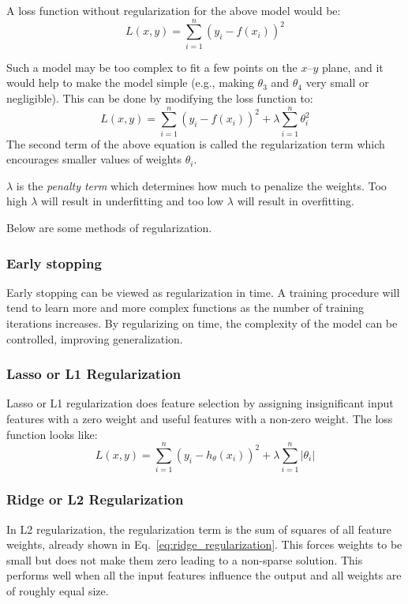 A loss function without regularization for the above model would be:
\begin{equation}
    L(x,y) = \sum_{i=1}^{n}(y_i - f(x_i))^2
\end{equation}

Such a model may be too complex to fit a few points on the $x$--$y$ plane, and it would help to make the model simple (e.g., making $\theta_3$ and $\theta_4$ very small or negligible). This can be done by modifying the loss function to:
\begin{equation}
    L(x,y) = \sum_{i=1}^{n}(y_i - f(x_i))^2 + \lambda \sum_{i=1}^{n} \theta_i^2
    \label{eq:ridge_regularization}
\end{equation}
The second term of the above equation is called the regularization term which encourages smaller values of weights $\theta_i$. 

$\lambda$ is the \emph{penalty term} which determines how much to penalize the weights. Too high $\lambda$ will result in underfitting and too low $\lambda$ will result in overfitting.

Below are some methods of regularization.

\subsubsection[Early stopping]{Early stopping\cite{WikiRegularization}}
\label{sec:early_stopping}
Early stopping can be viewed as regularization in time. A training procedure will tend to learn more and more complex functions as the number of training iterations increases. By regularizing on time, the complexity of the model can be controlled, improving generalization.

\subsubsection[Lasso or L1 Regularization]{Lasso or L1 Regularization\cite{l1l2regularization}}
\label{sec:lasso}
Lasso or L1 regularization does feature selection by assigning insignificant input features with a zero weight and useful features with a non-zero weight. The loss function looks like:
\begin{equation}
    L(x,y) = \sum_{i=1}^{n}(y_i - h_{\theta}(x_i))^2 + \lambda\sum_{i=1}^{n}|\theta_i|
\end{equation}

\subsubsection[Ridge or L2 Regularization]{Ridge or L2 Regularization\cite{l1l2regularization}}
\label{sec:ridge_regularization}
In L2 regularization, the regularization term is the sum of squares of all feature weights, already shown in Eq.~\ref{eq:ridge_regularization}. This forces weights to be small but does not make them zero leading to a non-sparse solution. This performs well when all the input features influence the output and all weights are of roughly equal size.

